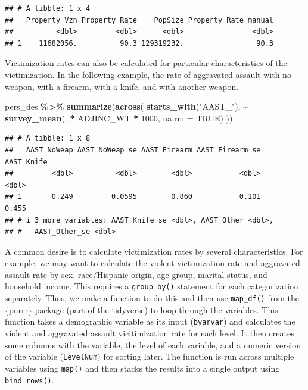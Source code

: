 \documentclass[
]{krantz}
\makeatletter
\newenvironment{Shaded}{\begin{snugshade}}{\end{snugshade}}
\newcommand{\AttributeTok}[1]{\textcolor[rgb]{0.27,0.27,0.27}{#1}}
\newcommand{\ConstantTok}[1]{\textcolor[rgb]{0.37,0.37,0.37}{#1}}
\newcommand{\DecValTok}[1]{\textcolor[rgb]{0.06,0.06,0.06}{#1}}
\newcommand{\FunctionTok}[1]{\textcolor[rgb]{0.27,0.27,0.27}{\textbf{#1}}}
\newcommand{\NormalTok}[1]{#1}
\newcommand{\SpecialCharTok}[1]{\textcolor[rgb]{0.43,0.43,0.43}{\textbf{#1}}}
\newcommand{\StringTok}[1]{\textcolor[rgb]{0.5,0.5,0.5}{#1}}
\newenvironment{kframe}{%
\medskip{}
\setlength{\fboxsep}{.8em}
 \def\at@end@of@kframe{}%
 \ifinner\ifhmode%
  \def\at@end@of@kframe{\end{minipage}}%
  \begin{minipage}{\columnwidth}%
 \fi\fi%
 \def\FrameCommand##1{\hskip\@totalleftmargin \hskip-\fboxsep
 \colorbox{shadecolor}{##1}\hskip-\fboxsep
     \hskip-\linewidth \hskip-\@totalleftmargin \hskip\columnwidth}%
 \MakeFramed {\advance\hsize-\width
   \@totalleftmargin\z@ \linewidth\hsize
   \@setminipage}}%
 {\par\unskip\endMakeFramed%
 \at@end@of@kframe}
\renewenvironment{Shaded}{\begin{kframe}}{\end{kframe}}
\makeatother
\begin{document}
\begin{verbatim}
## # A tibble: 1 x 4
##   Property_Vzn Property_Rate    PopSize Property_Rate_manual
##          <dbl>         <dbl>      <dbl>                <dbl>
## 1    11682056.          90.3 129319232.                 90.3
\end{verbatim}

Victimization rates can also be calculated for particular characteristics of the victimization. In the following example, the rate of aggravated assault with no weapon, with a firearm, with a knife, and with another weapon.

\begin{Shaded}
\begin{Highlighting}[]
\NormalTok{pers\_des }\SpecialCharTok{\%\textgreater{}\%}
  \FunctionTok{summarize}\NormalTok{(}\FunctionTok{across}\NormalTok{(}
    \FunctionTok{starts\_with}\NormalTok{(}\StringTok{"AAST\_"}\NormalTok{),}
    \SpecialCharTok{\textasciitilde{}} \FunctionTok{survey\_mean}\NormalTok{(. }\SpecialCharTok{*}\NormalTok{ ADJINC\_WT }\SpecialCharTok{*} \DecValTok{1000}\NormalTok{, }\AttributeTok{na.rm =} \ConstantTok{TRUE}\NormalTok{)}
\NormalTok{  ))}
\end{Highlighting}
\end{Shaded}

\begin{verbatim}
## # A tibble: 1 x 8
##   AAST_NoWeap AAST_NoWeap_se AAST_Firearm AAST_Firearm_se AAST_Knife
##         <dbl>          <dbl>        <dbl>           <dbl>      <dbl>
## 1       0.249         0.0595        0.860           0.101      0.455
## # i 3 more variables: AAST_Knife_se <dbl>, AAST_Other <dbl>,
## #   AAST_Other_se <dbl>
\end{verbatim}

A common desire is to calculate victimization rates by several characteristics. For example, we may want to calculate the violent victimization rate and aggravated assault rate by sex, race/Hispanic origin, age group, marital status, and household income. This requires a \texttt{group\_by()} statement for each categorization separately. Thus, we make a function to do this and then use \texttt{map\_df()} from the \{purrr\} package (part of the tidyverse) to loop through the variables. This function takes a demographic variable as its input (\texttt{byarvar}) and calculates the violent and aggravated assault vicitimization rate for each level. It then creates some columns with the variable, the level of each variable, and a numeric version of the variable (\texttt{LevelNum}) for sorting later. The function is run across multiple variables using \texttt{map()} and then stacks the results into a single output using \texttt{bind\_rows()}.
\end{document}

